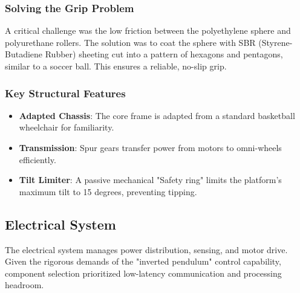 \documentclass[12pt]{article}
\begin{document}
\subsubsection{Solving the Grip Problem}
A critical challenge was the low friction between the polyethylene sphere and polyurethane rollers. The solution was to coat the sphere with SBR (Styrene-Butadiene Rubber) sheeting cut into a pattern of hexagons and pentagons, similar to a soccer ball. This ensures a reliable, no-slip grip.

\subsubsection{Key Structural Features}
\begin{itemize}
    \item \textbf{Adapted Chassis}: The core frame is adapted from a standard basketball wheelchair for familiarity.
    \item \textbf{Transmission}: Spur gears transfer power from motors to omni-wheels efficiently.
    \item \textbf{Tilt Limiter}: A passive mechanical "Safety ring" limits the platform's maximum tilt to 15 degrees, preventing tipping.
\end{itemize}

\subsection{Electrical System}
The electrical system manages power distribution, sensing, and motor drive. Given the rigorous demands of the "inverted pendulum" control capability, component selection prioritized low-latency communication and processing headroom.
\end{document}
